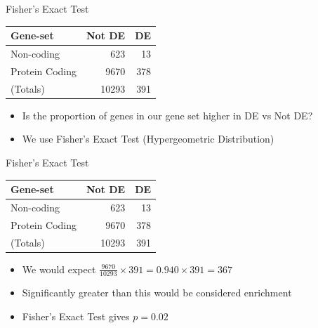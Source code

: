 \documentclass[11pt]{beamer}
\begin{document}
\begin{frame}{Fisher's Exact Test}

	\begin{table}[ht]
	\centering
	\small
	\begin{tabular}{lrr}
		\toprule
		\textbf{Gene-set} & \textbf{Not DE} & \textbf{DE} \\ 
		\midrule
		Non-coding & 623 &  13 \\ 
		Protein Coding & 9670 & 378 \\ 
		\midrule
		(Totals) & 10293 & 391\\
	   \bottomrule
	\end{tabular}
	\end{table}
	
	\begin{itemize}
		\item Is the proportion of genes in our gene set higher in DE vs Not DE?
		\item We use Fisher's Exact Test (Hypergeometric Distribution)
	\end{itemize}
	
\end{frame}
	
\begin{frame}{Fisher's Exact Test}	

	\begin{table}[ht]
	\centering
	\small
	\begin{tabular}{lrr}
		\toprule
		\textbf{Gene-set} & \textbf{Not DE} & \textbf{DE} \\ 
		\midrule
		Non-coding & 623 &  13 \\ 
		Protein Coding & 9670 & 378 \\ 
		\midrule
		(Totals) & 10293 & 391\\
	   \bottomrule
	\end{tabular}
	\end{table}

	\begin{itemize}
		\item We would expect $\frac{9670}{10293} \times 391 = 0.940 \times 391 = 367$
		\item Significantly greater than this would be considered enrichment
		\item Fisher's Exact Test gives $p = 0.02$
	\end{itemize}
	
\end{frame}
\end{document}
